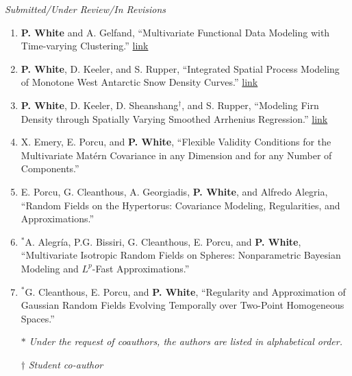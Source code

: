 \documentclass[12pt]{article}
\begin{document}
\emph{Submitted/Under Review/In Revisions}

\begin{enumerate}[label=$\bullet$]

\item \textbf{P. White} and A. Gelfand, ``Multivariate Functional Data Modeling with Time-varying Clustering.'' \href{https://arxiv.org/abs/1904.11518}{link}
\item \textbf{P. White}, D. Keeler, and S. Rupper, ``Integrated Spatial Process Modeling of Monotone West Antarctic Snow Density Curves.'' \href{https://arxiv.org/abs/2001.05520}{link}
\item \textbf{P. White}, D. Keeler, D. Sheanshang$^\dagger$, and S. Rupper, ``Modeling Firn Density through Spatially Varying Smoothed Arrhenius Regression.'' \href{https://arxiv.org/abs/2006.09329}{link}
\item X. Emery, E. Porcu, and \textbf{P. White}, ``Flexible Validity Conditions for the Multivariate Mat\'ern Covariance in any Dimension and for any Number of Components.''
\item E. Porcu, G. Cleanthous, A. Georgiadis, \textbf{P. White}, and  Alfredo Alegria, ``Random Fields on the Hypertorus: Covariance Modeling, Regularities, and Approximations.'' 
\item $^*$A. Alegr\'ia, P.G. Bissiri, G. Cleanthous, E. Porcu, and \textbf{P. White}, ``Multivariate Isotropic Random  Fields on Spheres: Nonparametric Bayesian Modeling and $L^p$-Fast Approximations.''
\item $^*$G. Cleanthous, E. Porcu, and \textbf{P. White}, ``Regularity and Approximation of Gaussian Random Fields Evolving Temporally over Two-Point Homogeneous Spaces.'' 
\setlength\itemsep{-1em} \\
\item[$*$] \textit{Under the request of coauthors, the authors are listed in alphabetical order.}\\
\item[$\dagger$] \textit{Student co-author}
\end{enumerate}
\end{document}
